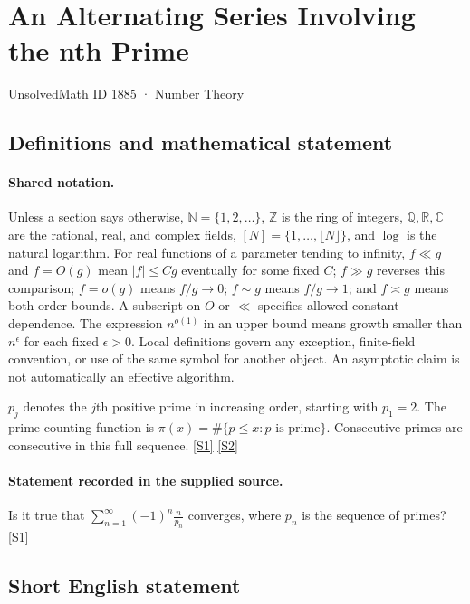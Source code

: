 \documentclass[11pt,a4paper]{article}
\newcommand{\N}{\mathbb{N}}
\newcommand{\Z}{\mathbb{Z}}
\newcommand{\Q}{\mathbb{Q}}
\newcommand{\R}{\mathbb{R}}
\newcommand{\C}{\mathbb{C}}
\newcommand{\sref}[2]{\hyperlink{source:#1:#2}{[S#2]}}
\begin{document}

\setcounter{section}{1884}

\section{An Alternating Series Involving the nth Prime}\label{1885}

{\small\sffamily UnsolvedMath ID 1885 · Number Theory}

\subsection{Definitions and mathematical statement}

\paragraph{Shared notation.}Unless a section says otherwise, $\N=\{1,2,\ldots\}$,
$\Z$ is the ring of integers, $\Q,\R,\C$ are the rational, real, and complex
fields, $[N]=\{1,\ldots,\lfloor N\rfloor\}$, and $\log$ is the natural
logarithm. For real functions of a parameter tending to infinity,
$f\ll g$ and $f=O(g)$ mean $|f|\leq Cg$ eventually for some fixed $C$;
$f\gg g$ reverses this comparison; $f=o(g)$ means $f/g\to0$;
$f\sim g$ means $f/g\to1$; and $f\asymp g$ means both order bounds.
A subscript on $O$ or $\ll$ specifies allowed constant dependence.
The expression $n^{o(1)}$ in an upper bound means growth smaller than
$n^\epsilon$ for each fixed $\epsilon>0$. Local definitions govern any
exception, finite-field convention, or use of the same symbol for another
object. An asymptotic claim is not automatically an effective algorithm.



$p_j$ denotes the $j$th positive prime in increasing order, starting with $p_1=2$. The prime-counting function is $\pi(x)=\#\{p\leq x:p\text{ is prime}\}$. Consecutive primes are consecutive in this full sequence. \sref{1885}{1} \sref{1885}{2}

\paragraph{Statement recorded in the supplied source.}
Is it true that $ \sum_{n=1}^\infty(-1)^n\frac{n}{p_n} $ converges, where $p_n$ is the sequence of primes? \sref{1885}{1}

\subsection{Short English statement}
\end{document}
